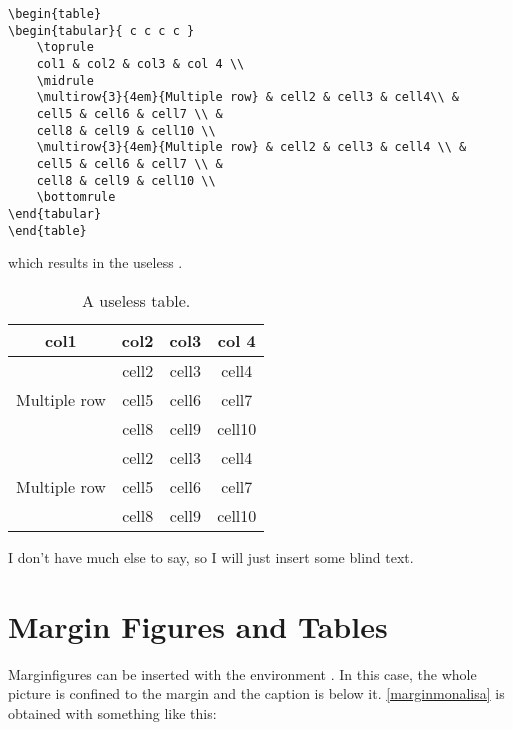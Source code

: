 \begin{lstlisting}[caption={Caption of a listing.}]
\begin{table}
\begin{tabular}{ c c c c }
	\toprule
	col1 & col2 & col3 & col 4 \\
	\midrule
	\multirow{3}{4em}{Multiple row} & cell2 & cell3 & cell4\\ &
	cell5 & cell6 & cell7 \\ &
	cell8 & cell9 & cell10 \\
	\multirow{3}{4em}{Multiple row} & cell2 & cell3 & cell4 \\ &
	cell5 & cell6 & cell7 \\ &
	cell8 & cell9 & cell10 \\
	\bottomrule
\end{tabular}
\end{table}
\end{lstlisting}

which results in the useless .

\begin{table}[ht]
\caption[A useless table]{A useless table.}
\label{useless}
\begin{tabular}{ c c c c }
	\toprule
	col1 & col2 & col3 & col 4 \\
	\midrule
	\multirow{3}{4em}{Multiple row} & cell2 & cell3 & cell4\\ &
	cell5 & cell6 & cell7 \\ &
	cell8 & cell9 & cell10 \\
	\multirow{3}{4em}{Multiple row} & cell2 & cell3 & cell4 \\ &
	cell5 & cell6 & cell7 \\ &
	cell8 & cell9 & cell10 \\
	\bottomrule
\end{tabular}
\end{table}

I don't have much else to say, so I will just insert some blind text. 
\blindtext

\section{Margin Figures and Tables}

Marginfigures can be inserted with the environment 
. In this case, the whole picture is confined 
to the margin and the caption is below it. \cref{marginmonalisa} is 
obtained with something like this:

